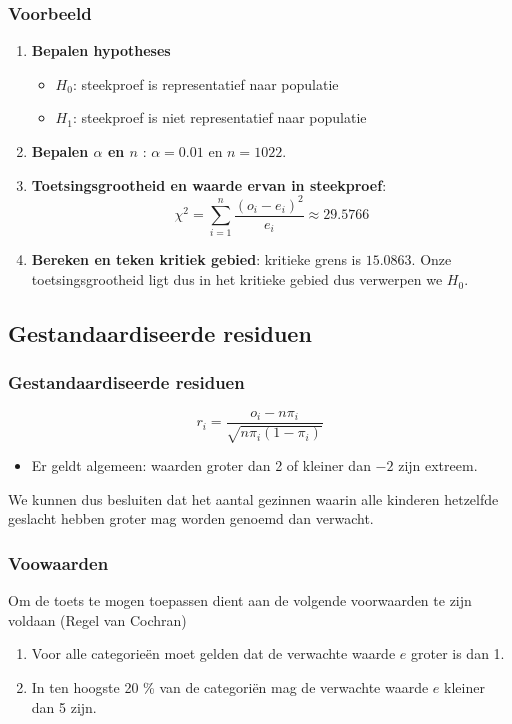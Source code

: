 \documentclass[aspectratio=169]{beamer}
\begin{document}
\begin{frame}
  \frametitle{Voorbeeld}
  \begin{enumerate}
  \item \textbf{Bepalen hypotheses}
    \begin{itemize}
      \item $H_{0}$: steekproef is representatief naar populatie
      \item $H_{1}$: steekproef is niet representatief naar populatie
    \end{itemize}
  \item \textbf{Bepalen $\alpha$ en $n$} : $\alpha = 0.01$ en $n = 1022$.
  \item \textbf{Toetsingsgrootheid en waarde ervan in steekproef}:
  \[ \chi^{2} = \sum_{i=1}^{n} \frac{(o_{i} - e_{i})^{2}}{e_{i}} \approx 29.5766 \]
  \item \textbf{Bereken en teken kritiek gebied}:  kritieke grens is $15.0863$. Onze toetsingsgrootheid ligt dus in het kritieke gebied dus verwerpen we $H_{0}$.
\end{enumerate}
\end{frame}

\subsection{Gestandaardiseerde residuen}
\begin{frame}
  \frametitle{Gestandaardiseerde residuen}
  \[ r_{i} = \frac{o_{i} - n \pi_{i}}{\sqrt{n \pi_{i}(1-\pi_{i})}} \]

  \begin{itemize}
    \item Er geldt algemeen: waarden groter dan 2 of kleiner dan $-2$ zijn extreem.
  \end{itemize}
  We kunnen dus besluiten dat het aantal gezinnen waarin alle kinderen hetzelfde geslacht hebben groter mag worden genoemd dan verwacht.

\end{frame}

\begin{frame}
  \frametitle{Voowaarden}
   Om de toets te mogen toepassen dient aan de volgende voorwaarden te zijn voldaan (Regel van Cochran)
\begin{enumerate}
  \item Voor alle categorie\"en moet gelden dat de verwachte waarde $e$ groter is dan 1.
  \item In ten hoogste 20 \% van de categori\"en mag de verwachte waarde $e$ kleiner dan 5 zijn.
\end{enumerate}
\end{frame}
\end{document}
